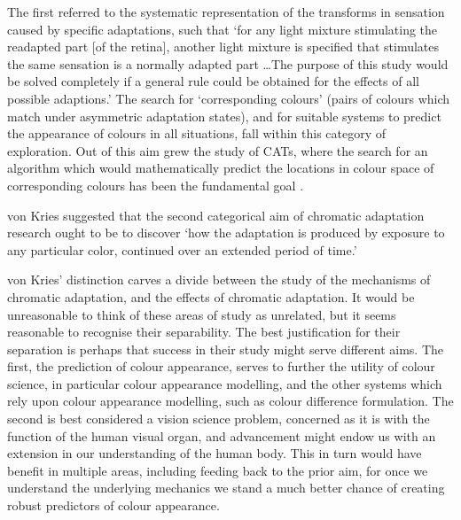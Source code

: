 The first referred to the systematic representation of the transforms in sensation caused by specific adaptations, such that `for any light mixture stimulating the readapted part [of the retina], another light mixture is specified that stimulates the same sensation is a normally adapted part \dots The purpose of this study would be solved completely if a general rule could be obtained for the effects of all possible adaptions.' The search for `corresponding colours' (pairs of colours which match under asymmetric adaptation states), and for suitable systems to predict the appearance of colours in all situations, fall within this category of exploration. Out of this aim grew the study of \glspl{CAT}, where the search for an algorithm which would mathematically predict the locations in colour space of corresponding colours has been the fundamental goal \citep{cie_cie_2004-1}.

von Kries suggested that the second categorical aim of chromatic adaptation research ought to be to discover `how the adaptation is produced by exposure to any particular color, continued over an extended period of time.' 

von Kries' distinction carves a divide between the study of the mechanisms of chromatic adaptation, and the effects of chromatic adaptation. It would be unreasonable to think of these areas of study as unrelated, but it seems reasonable to recognise their separability. The best justification for their separation is perhaps that success in their study might serve different aims. The first, the prediction of colour appearance, serves to further the utility of colour science, in particular colour appearance modelling, and the other systems which rely upon colour appearance modelling, such as colour difference formulation. 
The second is best considered a vision science problem, concerned as it is with the function of the human visual organ, and advancement might endow us with an extension in our understanding of the human body. This in turn would have benefit in multiple areas, including feeding back to the prior aim, for once we understand the underlying mechanics we stand a much better chance of creating robust predictors of colour appearance. 

